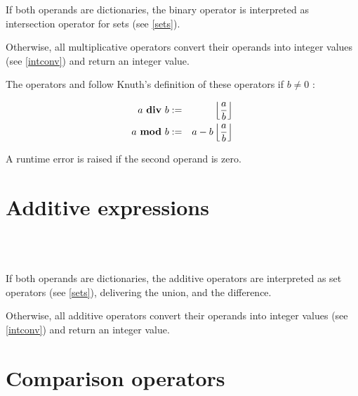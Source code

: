 \noindent
If both operands are dictionaries, the binary operator \token{$*$}
is interpreted as intersection
operator for sets (see \ref{sets}).

Otherwise, all multiplicative operators convert their operands into integer
values (see \ref{intconv}) and return an integer value.

The operators  and  follow
Knuth's definition of these operators if $b \not= 0$ \cite{Knuth:divmod}:

\begin{eqnarray*}
   a ~ \mbox{\keyword{div}} ~ b & := &
      \left\lfloor \frac{a}{b} \right\rfloor \\
   a ~ \mbox{\keyword{mod}} ~ b & := &
      a - b \left\lfloor \frac{a}{b} \right\rfloor
\end{eqnarray*}

\noindent
A runtime error is raised if the second operand is zero.

\section{Additive expressions}

\begin{grammar}
      \produces {} \\
      \produces {}
         \lextoken{$+$}  \\
      \produces {}
         \lextoken{$-$} 
\end{grammar}

\noindent
If both operands are dictionaries, the additive operators
are interpreted as set operators (see \ref{sets}),
\token{+} delivering the union,
and \token{$-$} the difference.

Otherwise, all additive operators convert their operands into integer
values (see \ref{intconv}) and return an integer value.

\section{Comparison operators}

